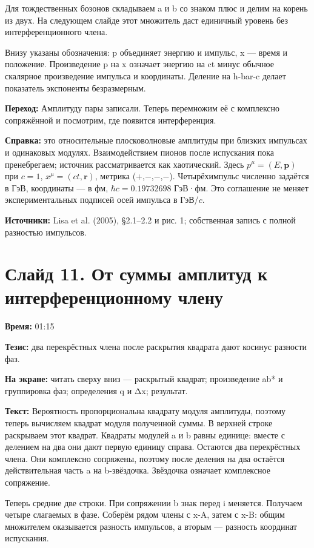 \documentclass[11pt,a4paper]{article}
\newcommand{\hc}{\hbar c}
\begin{document}
Для тождественных бозонов складываем a и b со знаком плюс и делим на корень из двух. На следующем слайде этот множитель даст единичный уровень без интерференционного члена.

Внизу указаны обозначения: p объединяет энергию и импульс, x — время и положение. Произведение p на x означает энергию на ct минус обычное скалярное произведение импульса и координаты. Деление на h-bar-c делает показатель экспоненты безразмерным.

\textbf{Переход:} Амплитуду пары записали. Теперь перемножим её с комплексно сопряжённой и посмотрим, где появится интерференция.

\textbf{Справка:} это относительные плосковолновые амплитуды при близких импульсах и одинаковых модулях. Взаимодействием пионов после испускания пока пренебрегаем; источник рассматривается как хаотический. Здесь \(p^\mu=(E,\mathbf p)\) при \(c=1\), \(x^\mu=(ct,\mathbf r)\), метрика (+,−,−,−). Четырёхимпульс численно задаётся в ГэВ, координаты — в фм, \(\hc=0.19732698\) ГэВ·фм. Это соглашение не меняет экспериментальных подписей осей импульса в ГэВ/\(c\).

\textbf{Источники:} Lisa et al. (2005), §2.1–2.2 и рис. 1; собственная запись с полной разностью импульсов.

\clearpage
\section*{Слайд 11. От суммы амплитуд к интерференционному члену}
\textbf{Время:} 01:15

\textbf{Тезис:} два перекрёстных члена после раскрытия квадрата дают косинус разности фаз.

\textbf{На экране:} читать сверху вниз — раскрытый квадрат; произведение ab* и группировка фаз; определения q и Δx; результат.

\textbf{Текст:} Вероятность пропорциональна квадрату модуля амплитуды, поэтому теперь вычисляем квадрат модуля полученной суммы. В верхней строке раскрываем этот квадрат. Квадраты модулей a и b равны единице: вместе с делением на два они дают первую единицу справа. Остаются два перекрёстных члена. Они комплексно сопряжены, поэтому после деления на два остаётся действительная часть a на b-звёздочка. Звёздочка означает комплексное сопряжение.

Теперь средние две строки. При сопряжении b знак перед i меняется. Получаем четыре слагаемых в фазе. Соберём рядом члены с x-A, затем с x-B: общим множителем оказывается разность импульсов, а вторым — разность координат испускания.
\end{document}
